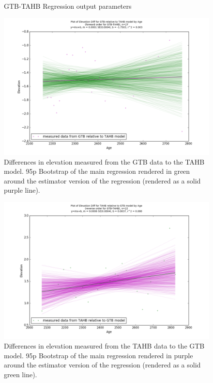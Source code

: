 \begin{figure}[H]
	\begin{flushleft}
	\end{flushleft}
	\caption{GTB-TAHB Regression output parameters}
	\label{fig:GTBxTAHB_regression}
\end{figure}

\newpage

\begin{figure}[H]
	\includegraphics[width=1.7\linewidth, angle=270 ]{data/bothNonZero/withinSeventyFivePercent/gias/theGIA_GTB_relative_to_TAHB.png}
	\caption{Differences in elevation measured from the GTB data to the TAHB model. 95p Bootstrap of the main regression rendered in green around the estimator version of the regression (rendered as a solid purple line).}
	\label{fig:gias_GTBxTAHB}
\end{figure}
\newpage


\begin{figure}[H]
	\includegraphics[width=1.7\linewidth, angle=270 ]{data/bothNonZero/withinSeventyFivePercent/gias/theGIA_TAHB_relative_to_GTB.png}
	\caption{Differences in elevation measured from the TAHB data to the GTB model. 95p Bootstrap of the main regression rendered in purple around the estimator version of the regression (rendered as a solid green line).}
	\label{fig:gias_TAHBxGTB}
\end{figure}
\newpage

